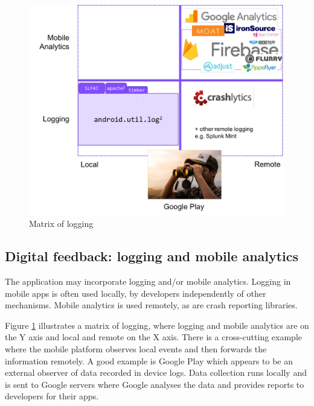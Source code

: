 \begin{figure} %
    \includegraphics[width=\linewidth]{images/matrix-of-logging.pdf}
    \caption{Matrix of logging}
    \label{fig:matrix-of-logging}
\end{figure}

\subsection{Digital feedback: logging and mobile analytics}
The application may incorporate logging and/or mobile analytics. Logging in mobile apps is often used locally, by developers independently of other mechanisms. Mobile analytics is used remotely, as are crash reporting libraries. 



Figure \ref{fig:matrix-of-logging} illustrates a matrix of logging, where logging and mobile analytics are on the Y axis and local and remote on the X axis. There is a cross-cutting example where the mobile platform observes local events and then forwards the information remotely. A good example is Google Play which appears to be an external observer of data recorded in device logs. Data collection runs locally and is sent to Google servers where Google analyses the data and provides reports to developers for their apps. %

